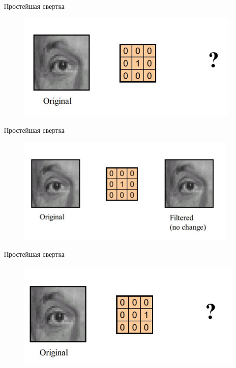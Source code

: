 \documentclass[10pt]{beamer}
\begin{document}
\begin{frame}{Простейшая свертка}
	\begin{figure}[htbp]
	  \includegraphics[height=150pt, keepaspectratio = true]{images/conv_easy}   
	\end{figure}
\end{frame}

\begin{frame}{Простейшая свертка}
	\begin{figure}[htbp]
	  \includegraphics[height=150pt, keepaspectratio = true]{images/conv_easy2}   
	\end{figure}
\end{frame}

\begin{frame}{Простейшая свертка}
	\begin{figure}[htbp]
	  \includegraphics[height=150pt, keepaspectratio = true]{images/conv_easy3}   
	\end{figure}
\end{frame}
\end{document}
